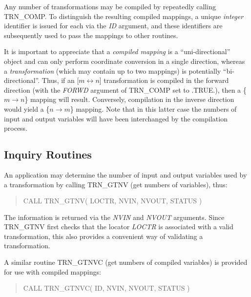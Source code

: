 \documentclass[twoside,nolof,11pt]{starlink}
\providecommand{\name}[1]{\small{#1}}
\providecommand{\fortvar}[1]{\emph{#1}}
\begin{document}
Any number of transformations may be compiled by repeatedly calling
\name{TRN\_COMP}.
To distinguish the resulting compiled mappings, a unique \emph{integer}
identifier is issued for each via the \fortvar{ID} argument, and these
identifiers are subsequently used to pass the mappings to other routines.

It is important to appreciate that a \emph{compiled mapping} is a
``uni-directional'' object and can only perform coordinate conversion in a
single direction, whereas a \emph{transformation} (which may contain up to
two mappings) is potentially ``bi-directional''.
Thus, if an [$m \leftrightarrow n$] transformation is compiled in the
forward direction (with the \fortvar{FORWD} argument of \name{TRN\_COMP} set
to \name{.TRUE.}), then a \mbox{\{$m \rightarrow n$\}} mapping will result.
Conversely, compilation in the inverse direction would yield a \mbox{\{$n
\rightarrow m$\}} mapping.
Note that in this latter case the numbers of input and output variables will
have been interchanged by the compilation process.


\subsection{Inquiry Routines}

An application may determine the number of input and output variables
used by a transformation by calling \name{TRN\_GTNV} (get numbers of
variables), thus:

\begin{quote}
\begin{terminalv}
CALL TRN_GTNV( LOCTR, NVIN, NVOUT, STATUS )
\end{terminalv}
\end{quote}

The information is returned via the \fortvar{NVIN} and \fortvar{NVOUT}
arguments.
Since \name{TRN\_GTNV} first checks that the locator \fortvar{LOCTR} is
associated with a valid transformation, this also provides a convenient way
of validating a transformation.

A similar routine \name{TRN\_GTNVC} (get numbers of compiled variables) is
provided for use with compiled mappings:

\begin{quote}
\begin{terminalv}
CALL TRN_GTNVC( ID, NVIN, NVOUT, STATUS )
\end{terminalv}
\end{quote}
\end{document}
